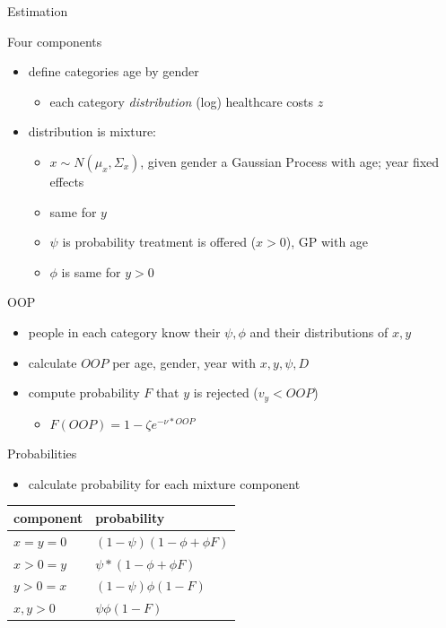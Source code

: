 \documentclass[presentation]{beamer}
\begin{document}
\begin{frame}[label={sec:org025e19e},fragile]{Estimation}
\begin{block}{Four components}
\begin{itemize}
\item define categories age by gender
\begin{itemize}
\item each category \emph{distribution} (log) healthcare costs \(z\)
\end{itemize}
\item distribution is mixture:
\begin{itemize}
\item \(x \sim N(\mu_x,\Sigma_x)\), given gender a Gaussian Process with age; year fixed effects
\item same for \(y\)
\item \(\psi\) is probability treatment is offered (\(x > 0\)), GP with age
\item \(\phi\) is same for \(y > 0\)
\end{itemize}
\end{itemize}
\end{block}

\begin{block}{OOP}
\begin{itemize}
\item people in each category know their \(\psi,\phi\) and their distributions of \(x,y\)
\item calculate \(OOP\) per age, gender, year with \(x,y,\psi,D\)
\item compute probability \(F\) that \(y\) is rejected (\(v_y < OOP\))
\begin{itemize}
\item \(F(OOP) = 1-\zeta e^{-\nu*OOP}\)
\end{itemize}
\end{itemize}
\end{block}

\begin{block}{Probabilities}
\begin{itemize}
\item calculate probability for each mixture component
\end{itemize}
\begin{center}
\begin{tabular}{ll}
component & probability\\
\hline
\(x=y=0\) & \((1-\psi)(1-\phi + \phi F)\)\\
\(x>0=y\) & \(\psi*(1-\phi + \phi F)\)\\
\(y>0=x\) & \((1-\psi)\phi(1-F)\)\\
\(x,y>0\) & \(\psi \phi (1-F)\)\\
\end{tabular}
\end{center}
\end{block}


\end{frame}
\end{document}
